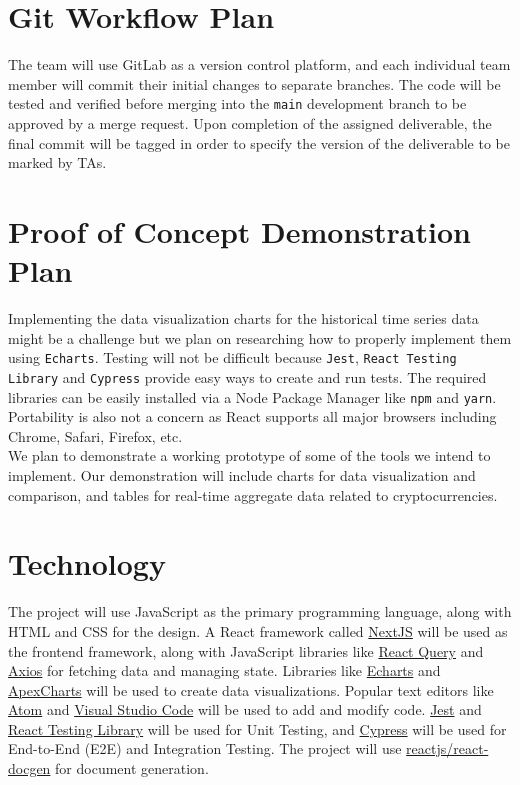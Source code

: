 \documentclass[12pt,fleqn]{article}
\begin{document}
\section{Git Workflow Plan}
\noindent The team will use GitLab as a version control platform, and each individual team member will commit their initial changes to separate branches. The code will be tested and verified before merging into the \texttt{main} development branch to be approved by a merge request. Upon completion of the assigned deliverable, the final commit will be tagged in order to specify the version of the deliverable to be marked by TAs.

\section{Proof of Concept Demonstration Plan}
\noindent Implementing the data visualization charts for the historical time series data might be a challenge but we plan on researching how to properly implement them using \texttt{Echarts}. Testing will not be difficult because \texttt{Jest}, \texttt{React Testing Library} and \texttt{Cypress} provide easy ways to create and run tests. The required libraries can be easily installed via a Node Package Manager like \texttt{npm} and \texttt{yarn}. Portability is also not a concern as React supports all major browsers including Chrome, Safari, Firefox, etc.\\
\newline
\noindent We plan to demonstrate a working prototype of some of the tools we intend to implement. Our demonstration will include charts for data visualization and comparison, and tables for real-time aggregate data related to cryptocurrencies.


\section{Technology}
\noindent The project will use JavaScript as the primary programming language, along with HTML and CSS for the design. A React framework called \href{https://nextjs.org/}{NextJS} will be used as the frontend framework, along with JavaScript libraries like \href{https://react-query.tanstack.com/}{React Query} and \href{https://axios-http.com/docs/intro}{Axios} for fetching data and managing state. Libraries like \href{https://echarts.apache.org/en/index.html}{Echarts} and \href{https://apexcharts.com/}{ApexCharts} will be used to create data visualizations. Popular text editors like \href{https://atom.io/}{Atom} and \href{https://code.visualstudio.com/}{Visual Studio Code} will be used to add and modify code. \href{https://jestjs.io/}{Jest} and \href{https://github.com/testing-library/react-testing-library}{React Testing Library} will be used for Unit Testing, and \href{https://www.cypress.io/}{Cypress} will be used for End-to-End (E2E) and Integration Testing. The project will use {\href{https://github.com/reactjs/react-docgen}{reactjs/react-docgen}} for document generation.
\end{document}
